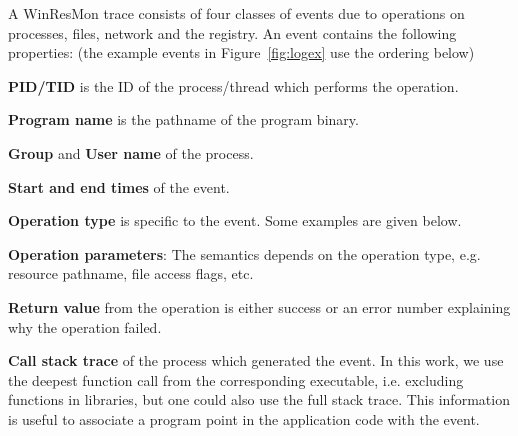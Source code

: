 A WinResMon trace consists of four classes of events
due to operations on processes, files, network and the registry.
An event contains the following properties: (the example events
in Figure~\ref{fig:logex} use the ordering below)
\begin{tightitemize}
\item {\bf PID/TID} is the ID of the process/thread which
performs the operation.
\item {\bf Program name} is the pathname of the program binary.
\item {\bf Group} and {\bf User name} of the process.
\item {\bf Start and end times} of the event.
\item {\bf Operation type} is specific to the event.
Some examples are given below.
\item {\bf Operation parameters}: The semantics depends on the operation type,
e.g.  resource pathname, file access flags, etc.
\item {\bf Return value} from the operation
is either success or an error number explaining why the operation failed.
\item {\bf Call stack trace} of the process which generated the event.
In this work, we use the deepest function call
from the corresponding executable, i.e.
excluding functions in libraries,
but one could also use the full stack trace.
This information is useful to associate a program point in the
application code with the event.
\end{tightitemize}

